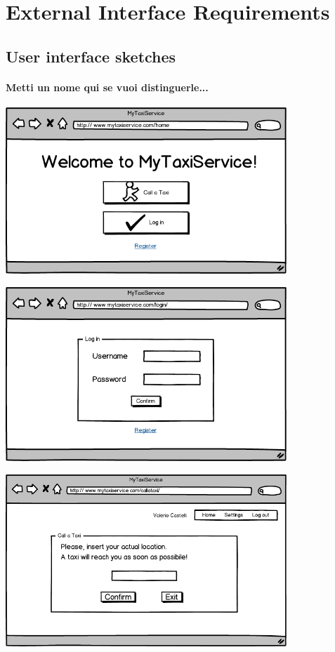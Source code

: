 \section{External Interface Requirements}
\subsection{User interface sketches}
\paragraph{Metti un nome qui se vuoi distinguerle...}
\begin{center}
\includegraphics[width=300pt,keepaspectratio]{images/guest_home.png}

\includegraphics[width=300pt,keepaspectratio]{images/guest_login.png}

\includegraphics[width=300pt,keepaspectratio]{images/user_call.png}


\end{center}
